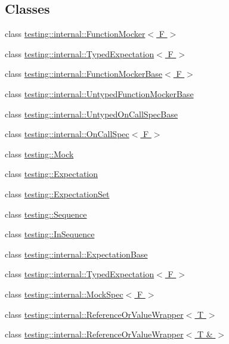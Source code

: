 \subsection*{Classes}
\begin{DoxyCompactItemize}
\item 
class \hyperlink{classtesting_1_1internal_1_1FunctionMocker}{testing\+::internal\+::\+Function\+Mocker$<$ F $>$}
\item 
class \hyperlink{classtesting_1_1internal_1_1TypedExpectation}{testing\+::internal\+::\+Typed\+Expectation$<$ F $>$}
\item 
class \hyperlink{classtesting_1_1internal_1_1FunctionMockerBase}{testing\+::internal\+::\+Function\+Mocker\+Base$<$ F $>$}
\item 
class \hyperlink{classtesting_1_1internal_1_1UntypedFunctionMockerBase}{testing\+::internal\+::\+Untyped\+Function\+Mocker\+Base}
\item 
class \hyperlink{classtesting_1_1internal_1_1UntypedOnCallSpecBase}{testing\+::internal\+::\+Untyped\+On\+Call\+Spec\+Base}
\item 
class \hyperlink{classtesting_1_1internal_1_1OnCallSpec}{testing\+::internal\+::\+On\+Call\+Spec$<$ F $>$}
\item 
class \hyperlink{classtesting_1_1Mock}{testing\+::\+Mock}
\item 
class \hyperlink{classtesting_1_1Expectation}{testing\+::\+Expectation}
\item 
class \hyperlink{classtesting_1_1ExpectationSet}{testing\+::\+Expectation\+Set}
\item 
class \hyperlink{classtesting_1_1Sequence}{testing\+::\+Sequence}
\item 
class \hyperlink{classtesting_1_1InSequence}{testing\+::\+In\+Sequence}
\item 
class \hyperlink{classtesting_1_1internal_1_1ExpectationBase}{testing\+::internal\+::\+Expectation\+Base}
\item 
class \hyperlink{classtesting_1_1internal_1_1TypedExpectation}{testing\+::internal\+::\+Typed\+Expectation$<$ F $>$}
\item 
class \hyperlink{classtesting_1_1internal_1_1MockSpec}{testing\+::internal\+::\+Mock\+Spec$<$ F $>$}
\item 
class \hyperlink{classtesting_1_1internal_1_1ReferenceOrValueWrapper}{testing\+::internal\+::\+Reference\+Or\+Value\+Wrapper$<$ T $>$}
\item 
class \hyperlink{classtesting_1_1internal_1_1ReferenceOrValueWrapper_3_01T_01_6_01_4}{testing\+::internal\+::\+Reference\+Or\+Value\+Wrapper$<$ T \& $>$}

\end{DoxyCompactItemize}
